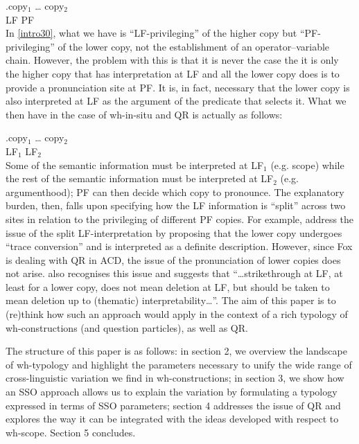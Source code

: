 \documentclass[charis]{glossa}
\begin{document}
\exg.\label{intro30}copy$_1$ {\dots} copy$_2$\\
   LF {} PF\\

In \ref{intro30}, what we have is ``LF-privileging'' of the higher copy but ``PF-privileging'' of the lower copy, not the establishment of an operator--variable chain. However, the problem with this is that it is never the case the it is only the higher copy that has interpretation at LF and all the lower copy does is to provide a pronunciation site at PF. It is, in fact, necessary that the lower copy is also interpreted at LF as the argument of the predicate that selects it. What we then have in the case of wh-in-situ and QR is actually as follows:

\exg.\label{intro40}copy$_1$ {\dots} copy$_2$\\
   LF$_1$ {} LF$_2$\\

Some of the semantic information must be interpreted at LF$_1$ (e.g. scope) while the rest of the semantic information must be interpreted at LF$_2$ (e.g. argumenthood); PF can then decide which copy to pronounce. The explanatory burden, then, falls upon specifying how the LF information is ``split'' across two sites in relation to the privileging of different PF copies. For example, \cite{fox:2002} address the issue of the split LF-interpretation by proposing that the lower copy undergoes ``trace conversion'' and is interpreted as a definite description. However, since Fox is dealing with QR in ACD, the issue of the pronunciation of lower copies does not arise. \cite{bobaljik:2002} also recognises this issue and suggests that ``\dots strikethrough at LF, at least for a lower copy, does not mean deletion at LF, but should be taken to mean deletion up to (thematic) interpretability\dots ''. The aim of this paper is to (re)think how such an approach would apply in the context of a rich typology of wh-constructions (and question particles), as well as QR.

The structure of this paper is as follows: in section 2, we overview the landscape of wh-typology and highlight the parameters necessary to unify the wide range of cross-linguistic variation we find in wh-constructions; in section 3, we show how an SSO approach allows us to explain the variation by formulating a typology expressed in terms of SSO parameters; section 4 addresses the issue of QR and explores the way it can be integrated with the ideas developed with respect to wh-scope. Section 5 concludes.
\end{document}
